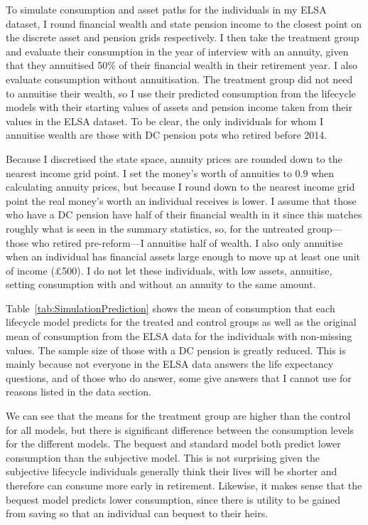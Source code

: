 \documentclass[12pt]{article}
\begin{document}
To simulate consumption and asset paths for the individuals in my ELSA dataset,
I round financial wealth and state pension income to the closest point on the
discrete asset and pension grids respectively. I then take the treatment group
and evaluate their consumption in the year of interview with an annuity, given
that they annuitised 50\% of their financial wealth in their retirement year. I
also evaluate consumption without annuitisation. The treatment group did not
need to annuitise their wealth, so I use their predicted consumption from the
lifecycle models with their starting values of assets and pension income taken
from their values in the ELSA dataset. To be clear, the only individuals for
whom I annuitise wealth are those with DC pension pots who retired before 2014.

Because I discretised the state space, annuity prices are rounded down to the
nearest income grid point. I set the money's worth of annuities to $0.9$ when
calculating annuity prices, but because I round down to the nearest income grid
point the real money's worth an individual receives is lower. I assume that
those who have a DC pension have half of their financial wealth in it since this
matches roughly what is seen in the summary statistics, so, for the untreated
group---those who retired pre-reform---I annuitise half of wealth. I also only
annuitise when an individual has financial assets large enough to move up at
least one unit of income (£500). I do not let these individuals, with low
assets, annuitise, setting consumption with and without an annuity to the same
amount.




Table~\ref{tab:SimulationPrediction} shows the mean of consumption that each
lifecycle model predicts for the treated and control groups as well as the
original mean of consumption from the ELSA data for the individuals with
non-missing values. The sample size of those with a DC pension is greatly
reduced. This is mainly because not everyone in the ELSA data answers the life
expectancy questions, and of those who do answer, some give answers that I
cannot use for reasons listed in the data section.

We can see that the means for the treatment group are higher than the control
for all models, but there is significant difference between the consumption
levels for the different models. The bequest and standard model both predict
lower consumption than the subjective model. This is not surprising given the
subjective lifecycle individuals generally think their lives will be shorter and
therefore can consume more early in retirement. Likewise, it makes sense that
the bequest model predicts lower consumption, since there is utility to be
gained from saving so that an individual can bequest to their heirs.
\end{document}
